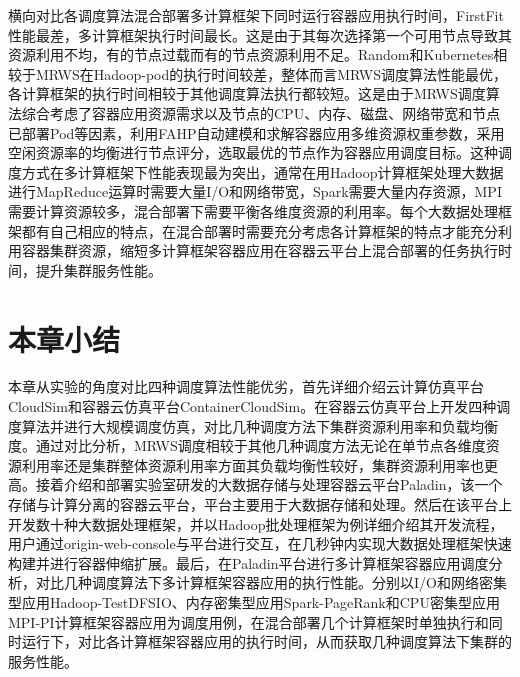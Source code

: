 横向对比各调度算法混合部署多计算框架下同时运行容器应用执行时间，FirstFit性能最差，多计算框架执行时间最长。这是由于其每次选择第一个可用节点导致其资源利用不均，有的节点过载而有的节点资源利用不足。Random和Kubernetes相较于MRWS在Hadoop-pod的执行时间较差，整体而言MRWS调度算法性能最优，各计算框架的执行时间相较于其他调度算法执行都较短。这是由于MRWS调度算法综合考虑了容器应用资源需求以及节点的CPU、内存、磁盘、网络带宽和节点已部署Pod等因素，利用FAHP自动建模和求解容器应用多维资源权重参数，采用空闲资源率的均衡进行节点评分，选取最优的节点作为容器应用调度目标。这种调度方式在多计算框架下性能表现最为突出，通常在用Hadoop计算框架处理大数据进行MapReduce运算时需要大量I/O和网络带宽，Spark需要大量内存资源，MPI需要计算资源较多，混合部署下需要平衡各维度资源的利用率。每个大数据处理框架都有自己相应的特点，在混合部署时需要充分考虑各计算框架的特点才能充分利用容器集群资源，缩短多计算框架容器应用在容器云平台上混合部署的任务执行时间，提升集群服务性能。

\section{本章小结}
本章从实验的角度对比四种调度算法性能优劣，首先详细介绍云计算仿真平台CloudSim和容器云仿真平台ContainerCloudSim。在容器云仿真平台上开发四种调度算法并进行大规模调度仿真，对比几种调度方法下集群资源利用率和负载均衡度。通过对比分析，MRWS调度相较于其他几种调度方法无论在单节点各维度资源利用率还是集群整体资源利用率方面其负载均衡性较好，集群资源利用率也更高。接着介绍和部署实验室研发的大数据存储与处理容器云平台Paladin，该一个存储与计算分离的容器云平台，平台主要用于大数据存储和处理。然后在该平台上开发数十种大数据处理框架，并以Hadoop批处理框架为例详细介绍其开发流程，用户通过origin-web-console与平台进行交互，在几秒钟内实现大数据处理框架快速构建并进行容器伸缩扩展。最后，在Paladin平台进行多计算框架容器应用调度分析，对比几种调度算法下多计算框架容器应用的执行性能。分别以I/O和网络密集型应用Hadoop-TestDFSIO、内存密集型应用Spark-PageRank和CPU密集型应用MPI-PI计算框架容器应用为调度用例，在混合部署几个计算框架时单独执行和同时运行下，对比各计算框架容器应用的执行时间，从而获取几种调度算法下集群的服务性能。



















